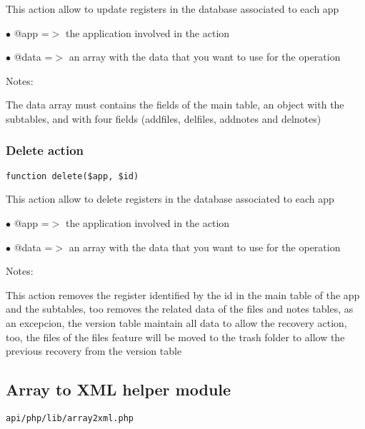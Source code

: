\documentclass[a4paper]{article}
\begin{document}
This action allow to update registers in the database associated to
each app

\begin{compactitem}
\item[\color{myblue}$\bullet$] @app  =$>$ the application involved in the action
\item[\color{myblue}$\bullet$] @data =$>$ an array with the data that you want to use for the operation
\end{compactitem}

Notes:

The data array must contains the fields of the main table, an object
with the subtables, and with four fields (addfiles, delfiles, addnotes
and delnotes)

\hypertarget{toc367}{}
\subsubsection{Delete action}

\begin{lstlisting}
function delete($app, $id)
\end{lstlisting}

This action allow to delete registers in the database associated to
each app

\begin{compactitem}
\item[\color{myblue}$\bullet$] @app  =$>$ the application involved in the action
\item[\color{myblue}$\bullet$] @data =$>$ an array with the data that you want to use for the operation
\end{compactitem}

Notes:

This action removes the register identified by the id in the main table
of the app and the subtables, too removes the related data of the files
and notes tables, as an excepcion, the version table maintain all data
to allow the recovery action, too, the files of the files feature will
be moved to the trash folder to allow the previous recovery from the
version table

\hypertarget{toc368}{}
\subsection{Array to XML helper module}

\begin{lstlisting}
api/php/lib/array2xml.php
\end{lstlisting}
\end{document}
